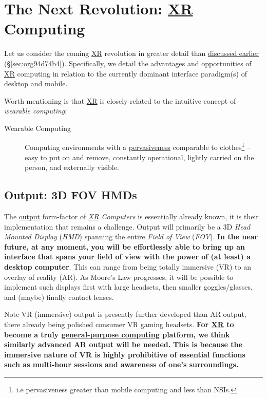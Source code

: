 \documentclass[logo,bsc,singlespacing,parskip]{infthesis}
\begin{document}
\chapter{The Next Revolution: \hyperref[org1d567af]{XR} Computing}
\label{sec:org13573e8}
Let us consider the coming \hyperref[org1d567af]{XR} revolution in greater detail than \hyperref[sec:org94d74b4]{discussed earlier} (\S \ref{sec:org94d74b4}).
Specifically, we detail the advantages and opportunities of \hyperref[org1d567af]{XR} computing in relation to the currently dominant interface paradigm(s) of desktop and mobile.

Worth mentioning is that \hyperref[org1d567af]{XR} is closely related to the intuitive concept of \emph{wearable computing}:

\begin{mdframed}
\begin{description}
\item[{Wearable Computing\label{wearable computing}}] Computing environments with a \hyperref[pervasiveness]{pervasiveness} comparable to clothes\footnote{i.e pervasiveness greater than mobile computing and less than NSIs.} -- easy to put on and remove, constantly operational, lightly carried on the person, and externally visible.
\end{description}
\end{mdframed}
\section{Output: 3D FOV HMDs}
\label{sec:orgd093f65}
The \hyperref[output]{output} form-factor of \emph{\hyperref[org1d567af]{XR} Computers} is essentially already known, it is their implementation that remains a challenge.
Output will primarily be a 3D \emph{Head Mounted Display} (\emph{HMD}) spanning the entire \emph{Field of View} (\emph{FOV}).
\textbf{In the near future, at any moment, you will be effortlessly able to bring up an interface that spans your field of view with the power of (at least) a desktop computer}.
This can range from being totally immersive (VR) to an overlay of reality (AR).
As Moore's Law progresses, it will be possible to implement such displays first with large headsets, then smaller goggles/glasses, and (maybe) finally contact lenses.

Note VR (immersive) output is presently further developed than AR output, there already being polished consumer VR gaming headsets.
\textbf{For \hyperref[org1d567af]{XR} to become a truly \hyperref[orga7e7736]{general-purpose computing} platform, we think similarly advanced AR output will be needed.}
\textbf{This is because the immersive nature of VR is highly prohibitive of essential functions such as multi-hour sessions and awareness of one's surroundings.}
\end{document}
